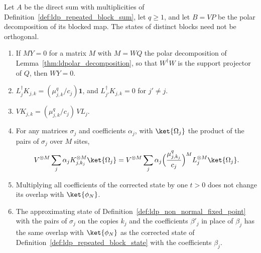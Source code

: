 \begin{lemma}
    \label{lem:ldp_one_copy_state}
    \leanok
    Let $A$ be the direct sum with multiplicities of
    Definition~\ref{def:ldp_repeated_block_sum}, let $q\geq1$, and let $B=VP$ be the
    polar decomposition of its blocked map. The states of distinct blocks need not be
    orthogonal.
    \begin{enumerate}
        \item If $MY=0$ for a matrix $M$ with $M=WQ$ the polar decomposition of
              Lemma~\ref{thm:ldpolar_decomposition}, so that $W^\dagger W$ is the support
              projector of $Q$, then $WY=0$.
        \item $L_j^\dagger K_{j,k}=(\mu_{j,k}^q/c_j)\mathbf 1$, and
              $L_{j'}^\dagger K_{j,k}=0$ for $j'\neq j$.
        \item $VK_{j,k}=(\mu_{j,k}^q/c_j)\,VL_j$.
        \item For any matrices $\sigma_j$ and coefficients $\alpha_j$, with
              $\ket{\Omega_j}$ the product of the pairs of $\sigma_j$ over $M$ sites,
              \begin{align*}
                  V^{\otimes M}\sum_j\alpha_jK_{j,k_j}^{\otimes M}\ket{\Omega_j}
                  =V^{\otimes M}\sum_j\alpha_j\Bigl(\frac{\mu_{j,k_j}^q}{c_j}\Bigr)^M
                  L_j^{\otimes M}\ket{\Omega_j}.
              \end{align*}
        \item Multiplying all coefficients of the corrected state by one $t>0$ does not
              change its overlap with $\ket{\phi_N}$.
        \item The approximating state of Definition~\ref{def:ldp_non_normal_fixed_point}
              with the pairs of $\sigma_j$ on the copies $k_j$ and the coefficients
              $\beta'_j$ in place of $\beta_j$ has the same overlap with
              $\ket{\phi_N}$ as the corrected state of
              Definition~\ref{def:ldp_repeated_block_state} with the coefficients
              $\beta_j$.
    \end{enumerate}
\end{lemma}
